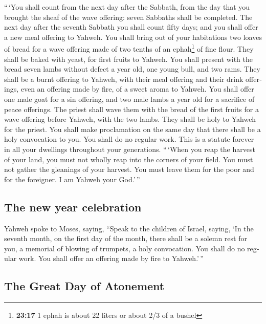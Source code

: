 \begin{paracol}{2}
\begin{otherlanguage}{english}
 ``\,`You shall count from the next day after the
Sabbath, from the day that you brought the sheaf of the wave offering:
seven Sabbaths shall be completed.  The next day after
the seventh Sabbath you shall count fifty days; and you shall offer a
new meal offering to Yahweh.  You shall bring out of your
habitations two loaves of bread for a wave offering made of two tenths
of an ephah\footnote{\textbf{23:17} 1 ephah is about 22 liters or about
  2/3 of a bushel} of fine flour. They shall be baked with yeast, for
first fruits to Yahweh.  You shall present with the bread
seven lambs without defect a year old, one young bull, and two rams.
They shall be a burnt offering to Yahweh, with their meal offering and
their drink offerings, even an offering made by fire, of a sweet aroma
to Yahweh.  You shall offer one male goat for a sin
offering, and two male lambs a year old for a sacrifice of peace
offerings.  The priest shall wave them with the bread of
the first fruits for a wave offering before Yahweh, with the two lambs.
They shall be holy to Yahweh for the priest.  You shall
make proclamation on the same day that there shall be a holy convocation
to you. You shall do no regular work. This is a statute forever in all
your dwellings throughout your generations.  ``\,`When
you reap the harvest of your land, you must not wholly reap into the
corners of your field. You must not gather the gleanings of your
harvest. You must leave them for the poor and for the foreigner. I am
Yahweh your God.'\,''

\hypertarget{the-new-year-celebration}{%
\subsection{The new year celebration}\label{the-new-year-celebration}}

 Yahweh spoke to Moses, saying,  ``Speak
to the children of Israel, saying, `In the seventh month, on the first
day of the month, there shall be a solemn rest for you, a memorial of
blowing of trumpets, a holy convocation.  You shall do no
regular work. You shall offer an offering made by fire to Yahweh.'\,''

\hypertarget{the-great-day-of-atonement}{%
\subsection{The Great Day of
Atonement}\label{the-great-day-of-atonement}}


\end{otherlanguage}
\end{paracol}
